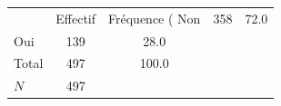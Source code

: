 {
\def\sym#1{\ifmmode^{#1}\else\(^{#1}\)\fi}
\begin{tabular}{l*{1}{cc}}
\toprule
            &    Effectif&Fréquence (%
\midrule
Non         &         358&        72.0\\
Oui         &         139&        28.0\\
Total       &         497&       100.0\\
\midrule
\(N\)       &         497&            \\
\bottomrule
\end{tabular}
}
